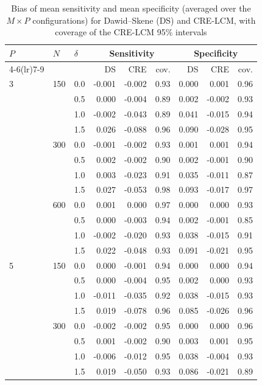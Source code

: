 \begin{table}[htbp]
\centering
\scriptsize
\caption{Bias of mean sensitivity and mean specificity (averaged over the $M \times P$ configurations) for Dawid--Skene (DS) and CRE-LCM, with coverage of the CRE-LCM 95\% intervals}\label{tab:sensspec}
\begin{tabular}{lllrrrrrr}
\toprule
$P$ & $N$ & $\delta$ & \multicolumn{3}{c}{Sensitivity} & \multicolumn{3}{c}{Specificity} \\
\cmidrule(lr){4-6}\cmidrule(lr){7-9}
 & & & DS & CRE & cov. & DS & CRE & cov. \\
\midrule
3 & 150 & 0.0 & -0.001 & -0.002 & 0.93 & 0.000 & 0.001 & 0.96 \\
 &  & 0.5 & 0.000 & -0.004 & 0.89 & 0.002 & -0.002 & 0.93 \\
 &  & 1.0 & -0.002 & -0.043 & 0.89 & 0.041 & -0.015 & 0.94 \\
 &  & 1.5 & 0.026 & -0.088 & 0.96 & 0.090 & -0.028 & 0.95 \\
 & 300 & 0.0 & -0.001 & -0.002 & 0.93 & 0.001 & 0.001 & 0.94 \\
 &  & 0.5 & 0.002 & -0.002 & 0.90 & 0.002 & -0.001 & 0.90 \\
 &  & 1.0 & 0.003 & -0.023 & 0.91 & 0.035 & -0.011 & 0.87 \\
 &  & 1.5 & 0.027 & -0.053 & 0.98 & 0.093 & -0.017 & 0.97 \\
 & 600 & 0.0 & 0.001 & 0.000 & 0.97 & 0.000 & 0.000 & 0.93 \\
 &  & 0.5 & 0.000 & -0.003 & 0.94 & 0.002 & -0.001 & 0.85 \\
 &  & 1.0 & -0.002 & -0.020 & 0.93 & 0.038 & -0.015 & 0.91 \\
 &  & 1.5 & 0.022 & -0.048 & 0.93 & 0.091 & -0.021 & 0.95 \\
5 & 150 & 0.0 & 0.000 & -0.001 & 0.94 & 0.000 & 0.000 & 0.94 \\
 &  & 0.5 & 0.000 & -0.004 & 0.95 & 0.002 & 0.000 & 0.93 \\
 &  & 1.0 & -0.011 & -0.035 & 0.92 & 0.038 & -0.015 & 0.93 \\
 &  & 1.5 & 0.019 & -0.078 & 0.96 & 0.085 & -0.026 & 0.96 \\
 & 300 & 0.0 & -0.002 & -0.002 & 0.95 & 0.000 & 0.000 & 0.96 \\
 &  & 0.5 & 0.001 & -0.002 & 0.90 & 0.003 & 0.001 & 0.95 \\
 &  & 1.0 & -0.006 & -0.012 & 0.95 & 0.038 & -0.004 & 0.93 \\
 &  & 1.5 & 0.019 & -0.050 & 0.93 & 0.086 & -0.021 & 0.89 \\

\end{tabular}
\end{table}
